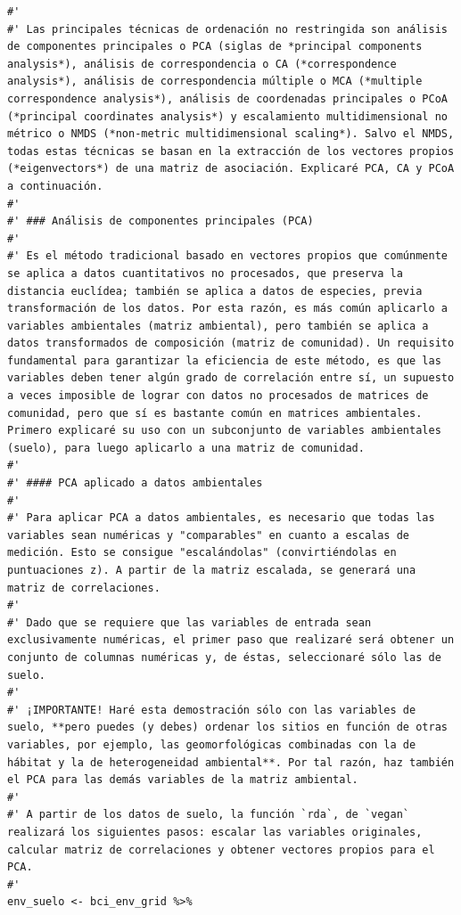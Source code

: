 \documentclass[11pt,]{article}
\begin{document}
\begin{verbatim}
#' 
#' Las principales técnicas de ordenación no restringida son análisis de componentes principales o PCA (siglas de *principal components analysis*), análisis de correspondencia o CA (*correspondence analysis*), análisis de correspondencia múltiple o MCA (*multiple correspondence analysis*), análisis de coordenadas principales o PCoA (*principal coordinates analysis*) y escalamiento multidimensional no métrico o NMDS (*non-metric multidimensional scaling*). Salvo el NMDS, todas estas técnicas se basan en la extracción de los vectores propios (*eigenvectors*) de una matriz de asociación. Explicaré PCA, CA y PCoA a continuación.
#' 
#' ### Análisis de componentes principales (PCA)
#' 
#' Es el método tradicional basado en vectores propios que comúnmente se aplica a datos cuantitativos no procesados, que preserva la distancia euclídea; también se aplica a datos de especies, previa transformación de los datos. Por esta razón, es más común aplicarlo a variables ambientales (matriz ambiental), pero también se aplica a datos transformados de composición (matriz de comunidad). Un requisito fundamental para garantizar la eficiencia de este método, es que las variables deben tener algún grado de correlación entre sí, un supuesto a veces imposible de lograr con datos no procesados de matrices de comunidad, pero que sí es bastante común en matrices ambientales. Primero explicaré su uso con un subconjunto de variables ambientales (suelo), para luego aplicarlo a una matriz de comunidad.
#' 
#' #### PCA aplicado a datos ambientales
#' 
#' Para aplicar PCA a datos ambientales, es necesario que todas las variables sean numéricas y "comparables" en cuanto a escalas de medición. Esto se consigue "escalándolas" (convirtiéndolas en puntuaciones z). A partir de la matriz escalada, se generará una matriz de correlaciones.
#' 
#' Dado que se requiere que las variables de entrada sean exclusivamente numéricas, el primer paso que realizaré será obtener un conjunto de columnas numéricas y, de éstas, seleccionaré sólo las de suelo.
#' 
#' ¡IMPORTANTE! Haré esta demostración sólo con las variables de suelo, **pero puedes (y debes) ordenar los sitios en función de otras variables, por ejemplo, las geomorfológicas combinadas con la de hábitat y la de heterogeneidad ambiental**. Por tal razón, haz también el PCA para las demás variables de la matriz ambiental. 
#' 
#' A partir de los datos de suelo, la función `rda`, de `vegan` realizará los siguientes pasos: escalar las variables originales, calcular matriz de correlaciones y obtener vectores propios para el PCA.
#' 
env_suelo <- bci_env_grid %>%

\end{verbatim}
\end{document}
